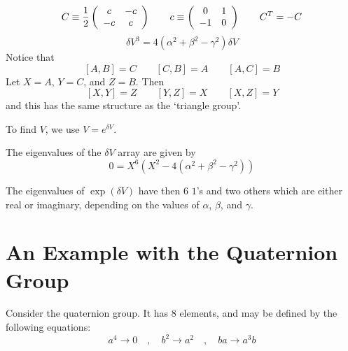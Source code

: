 \documentclass[12pt]{article}
\begin{document}
$$
C \equiv {1 \over 2} 
\left( \begin{array}{cc} c & -c \\ -c & c \\ \end{array} \right) \quad \quad
c \equiv \left( \begin{array}{cc} 0 & 1 \\ -1 & 0 \\ \end{array} \right) \quad \quad
C^T = -C
$$
\begin{equation}
\delta V^3 = 4 \left( \alpha^2 + \beta^2 - \gamma^2 \right) \delta V
\end{equation}
 Notice that
$$
\left[ A,B \right] = C \quad \quad
\left[ C,B \right] = A \quad \quad
\left[ A,C \right] = B
$$
Let $X=A$, $Y=C$, and $Z=B$.  Then
$$
\left[ X,Y \right] = Z \quad \quad
\left[ Y,Z \right] = X \quad \quad
\left[ X,Z \right] = Y
$$
and this has the same structure as the `triangle group'.

 To find $V$, we use $V = e^{\delta V}$.


 The eigenvalues of the $\delta V$ array are given by
\begin{equation}
0 = X^6 \left( X^2 - 4\left(\alpha^2+\beta^2-\gamma^2 \right) \right)
\end{equation}

 The eigenvalues of $\exp(\delta V)$ have then 6 $1$'s and two others
which are either real or imaginary, depending on the values of
$\alpha$, $\beta$, and $\gamma$.

\section{ An Example with the Quaternion Group}
 Consider the quaternion group.  It has 8 elements, and
may be defined by the following equations:
\begin{equation}
a^4 \rightarrow 0 \quad , \quad b^2 \rightarrow a^2 \quad , \quad b a \rightarrow
a^3 b
\end{equation}
\end{document}
